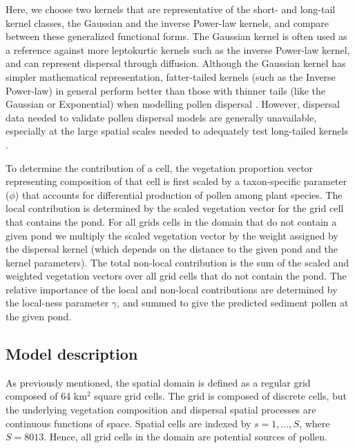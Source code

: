 \documentclass[12pt]{article}
\begin{document}
Here, we choose two kernels that are representative of the short- and
long-tail kernel classes, the Gaussian and the inverse Power-law
kernels, and compare between these generalized functional forms. The
Gaussian kernel is often used as a reference against more leptokurtic
kernels such as the inverse Power-law kernel, and can represent
dispersal through diffusion. Although the Gaussian kernel has simpler
mathematical representation, fatter-tailed kernels (such as the
Inverse Power-law) in general perform better than those with thinner
tails (like the Gaussian or Exponential) when modelling pollen
dispersal \citep{devaux2007modelling, austerlitz2004using}. However,
dispersal data needed to validate pollen dispersal models are
generally unavailable, especially at the large spatial scales needed
to adequately test long-tailed kernels \citep{clobert2012dispersal}.


To determine the contribution of a cell, the vegetation proportion
vector representing composition of that cell is first scaled by a
taxon-specific parameter ($\phi$) that accounts for differential
production of pollen among plant species. The local contribution is
determined by the scaled vegetation vector for the grid cell that
contains the pond. For all grids cells in the domain that do not
contain a given pond we multiply the scaled vegetation vector by the
weight assigned by the dispersal kernel (which depends on the distance
to the given pond and the kernel parameters). The total non-local
contribution is the sum of the scaled and weighted vegetation vectors
over all grid cells that do not contain the pond. The relative
importance of the local and non-local contributions are determined by
the local-ness parameter $\gamma$, and summed to give the predicted
sediment pollen at the given pond.

\subsection{Model description}

As previously mentioned, the spatial domain is defined as a regular
grid composed of 64 km$^2$ square grid cells. The grid is composed of
discrete cells, but the underlying vegetation composition and
dispersal spatial processes are continuous functions of space. Spatial
cells are indexed by $s=1,\ldots,S$, where $S=8013$. Hence, all grid
cells in the domain are potential sources of pollen.
\end{document}
